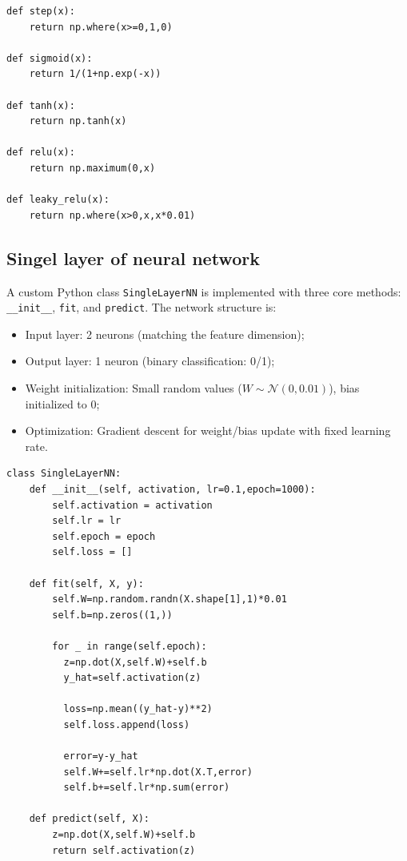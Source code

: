 \documentclass[11pt]{article}
\begin{document}
\begin{lstlisting}[caption={Five different activation function}]
def step(x):
    return np.where(x>=0,1,0)

def sigmoid(x):
    return 1/(1+np.exp(-x))

def tanh(x):
    return np.tanh(x)

def relu(x):
    return np.maximum(0,x)

def leaky_relu(x):
    return np.where(x>0,x,x*0.01)
\end{lstlisting}

\subsection{Singel layer of neural network}
A custom Python class \texttt{SingleLayerNN} is implemented with three core methods: \texttt{\_\_init\_\_}, \texttt{fit}, and \texttt{predict}. The network structure is:
\begin{itemize}
    \item Input layer: 2 neurons (matching the feature dimension);
    \item Output layer: 1 neuron (binary classification: 0/1);
    \item Weight initialization: Small random values ($W \sim \mathcal{N}(0,0.01)$), bias initialized to 0;
    \item Optimization: Gradient descent for weight/bias update with fixed learning rate.
\end{itemize}
\begin{lstlisting}[caption={Singel layer of neural network}]
class SingleLayerNN:
    def __init__(self, activation, lr=0.1,epoch=1000):
        self.activation = activation
        self.lr = lr
        self.epoch = epoch
        self.loss = []

    def fit(self, X, y):
        self.W=np.random.randn(X.shape[1],1)*0.01
        self.b=np.zeros((1,))

        for _ in range(self.epoch):
          z=np.dot(X,self.W)+self.b
          y_hat=self.activation(z)

          loss=np.mean((y_hat-y)**2)
          self.loss.append(loss)

          error=y-y_hat
          self.W+=self.lr*np.dot(X.T,error)
          self.b+=self.lr*np.sum(error)

    def predict(self, X):
        z=np.dot(X,self.W)+self.b
        return self.activation(z)
\end{lstlisting}
\end{document}
